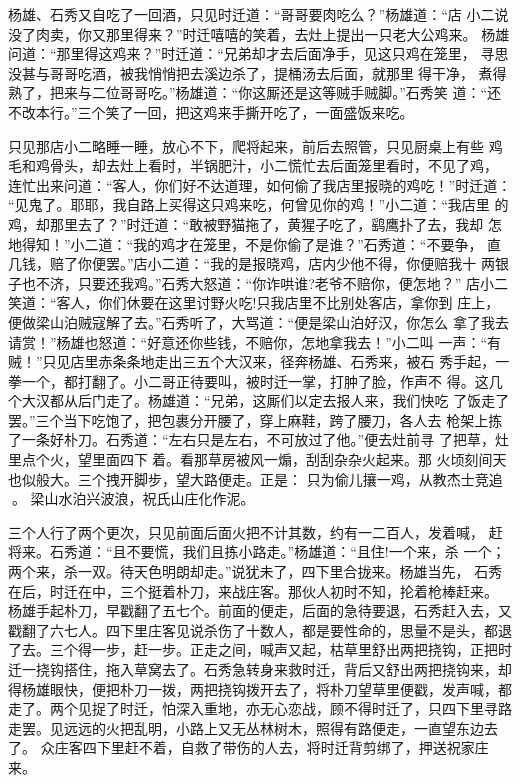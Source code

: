 杨雄、石秀又自吃了一回酒，只见时迁道：“哥哥要肉吃么？”杨雄道：“店
小二说没了肉卖，你又那里得来？”时迁嘻嘻的笑着，去灶上提出一只老大公鸡来。
杨雄问道：“那里得这鸡来？”时迁道：“兄弟却才去后面净手，见这只鸡在笼里，
寻思没甚与哥哥吃酒，被我悄悄把去溪边杀了，提桶汤去后面，就那里得干净，
煮得熟了，把来与二位哥哥吃。”杨雄道：“你这厮还是这等贼手贼脚。”石秀笑
道：“还不改本行。”三个笑了一回，把这鸡来手撕开吃了，一面盛饭来吃。

只见那店小二略睡一睡，放心不下，爬将起来，前后去照管，只见厨桌上有些
鸡毛和鸡骨头，却去灶上看时，半锅肥汁，小二慌忙去后面笼里看时，不见了鸡，
连忙出来问道：“客人，你们好不达道理，如何偷了我店里报晓的鸡吃！”时迁道：
“见鬼了。耶耶，我自路上买得这只鸡来吃，何曾见你的鸡！”小二道：“我店里
的鸡，却那里去了？”时迁道：“敢被野猫拖了，黄猩子吃了，鹞鹰扑了去，我却
怎地得知！”小二道：“我的鸡才在笼里，不是你偷了是谁？”石秀道：“不要争，
直几钱，赔了你便罢。”店小二道：“我的是报晓鸡，店内少他不得，你便赔我十
两银子也不济，只要还我鸡。”石秀大怒道：“你诈哄谁?老爷不赔你，便怎地？”
店小二笑道：“客人，你们休要在这里讨野火吃!只我店里不比别处客店，拿你到
庄上，便做梁山泊贼寇解了去。”石秀听了，大骂道：“便是梁山泊好汉，你怎么
拿了我去请赏！”杨雄也怒道：“好意还你些钱，不赔你，怎地拿我去！”小二叫
一声：“有贼！”只见店里赤条条地走出三五个大汉来，径奔杨雄、石秀来，被石
秀手起，一拳一个，都打翻了。小二哥正待要叫，被时迁一掌，打肿了脸，作声不
得。这几个大汉都从后门走了。杨雄道：“兄弟，这厮们以定去报人来，我们快吃
了饭走了罢。”三个当下吃饱了，把包裹分开腰了，穿上麻鞋，跨了腰刀，各人去
枪架上拣了一条好朴刀。石秀道：“左右只是左右，不可放过了他。”便去灶前寻
了把草，灶里点个火，望里面四下着。看那草房被风一煽，刮刮杂杂火起来。那
火顷刻间天也似般大。三个拽开脚步，望大路便走。正是：
只为偷儿攘一鸡，从教杰士竞追。
梁山水泊兴波浪，祝氏山庄化作泥。

三个人行了两个更次，只见前面后面火把不计其数，约有一二百人，发着喊，
赶将来。石秀道：“且不要慌，我们且拣小路走。”杨雄道：“且住!一个来，杀
一个；两个来，杀一双。待天色明朗却走。”说犹未了，四下里合拢来。杨雄当先，
石秀在后，时迁在中，三个挺着朴刀，来战庄客。那伙人初时不知，抡着枪棒赶来。
杨雄手起朴刀，早戳翻了五七个。前面的便走，后面的急待要退，石秀赶入去，又
戳翻了六七人。四下里庄客见说杀伤了十数人，都是要性命的，思量不是头，都退
了去。三个得一步，赶一步。正走之间，喊声又起，枯草里舒出两把挠钩，正把时
迁一挠钩搭住，拖入草窝去了。石秀急转身来救时迁，背后又舒出两把挠钩来，却
得杨雄眼快，便把朴刀一拨，两把挠钩拨开去了，将朴刀望草里便戳，发声喊，都
走了。两个见捉了时迁，怕深入重地，亦无心恋战，顾不得时迁了，只四下里寻路
走罢。见远远的火把乱明，小路上又无丛林树木，照得有路便走，一直望东边去了。
众庄客四下里赶不着，自救了带伤的人去，将时迁背剪绑了，押送祝家庄来。

